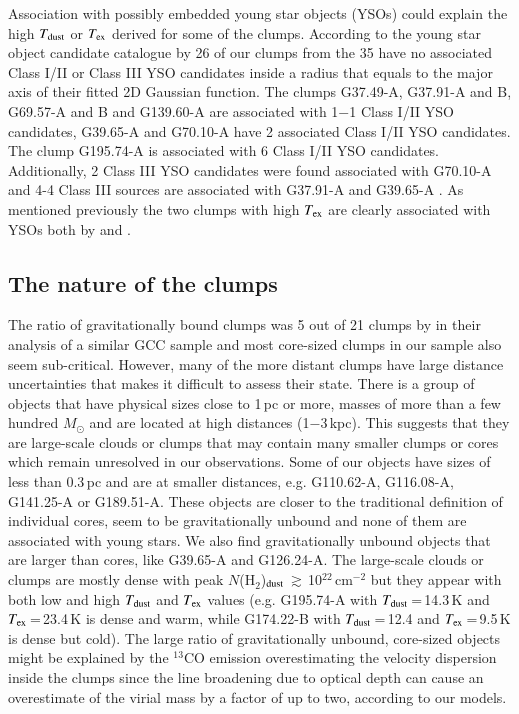 \documentclass[printer]{aa}
\begin{document}
Association with possibly embedded young star objects (YSOs) could explain the high $T_{\rm dust}$ or $T_{\rm ex}$ derived for some of the clumps. According to the young star object candidate catalogue by \citet{marton2016} 26 of our clumps from the 35 have no associated Class I/II or Class III YSO candidates inside a radius that equals to the major axis of their fitted 2D Gaussian function. The clumps G37.49-A, G37.91-A and B, G69.57-A and B and G139.60-A are associated with 1$-$1 Class I/II YSO candidates, G39.65-A and G70.10-A have 2 associated Class I/II YSO candidates. The clump G195.74-A is associated with 6 Class I/II YSO candidates. Additionally, 2 Class III YSO candidates were found associated with G70.10-A and 4-4 Class III sources are associated with G37.91-A and G39.65-A \citep{marton2016c}. As mentioned previously the two clumps with high $T_{\rm ex}$ are clearly associated with YSOs both by \citet{marton2016} and \citet{montillaud2015}. 

\subsection{The nature of the clumps}

The ratio of gravitationally bound clumps was 5 out of 21 clumps by \citet{parikka2015} in their analysis of a similar GCC sample and most core-sized clumps in our sample also seem sub-critical. However, many of the more distant clumps have large distance uncertainties that makes it difficult to assess their state. There is a group of objects that have physical sizes close to 1\,pc or more, masses of more than a few hundred $M_{\odot}$ and are located at high distances (1$-$3\,kpc).
This suggests that they are large-scale clouds or clumps that may contain many smaller clumps or cores which remain unresolved in our observations. Some of our objects have sizes of less than 0.3\,pc and are at smaller distances, e.g. G110.62-A, G116.08-A, G141.25-A or G189.51-A. These objects are closer to the traditional definition of individual cores, seem to be gravitationally unbound and none of them are associated with young stars. We also find gravitationally unbound objects that are larger than cores, like G39.65-A and G126.24-A. The large-scale clouds or clumps are mostly dense with peak $N$(H$_2$)$_{\rm dust}$\,$\gtrsim$\,10$^{22}$\,cm$^{-2}$ but they appear with both low and high $T_{\rm dust}$ and $T_{\rm ex}$ values (e.g. G195.74-A with $T_{\rm dust}$\,=\,14.3\,K and $T_{\rm ex}$\,=\,23.4\,K is dense and warm, while G174.22-B with $T_{\rm dust}$\,=\,12.4 and $T_{\rm ex}$\,=\,9.5\,K is dense but cold). The large ratio of gravitationally unbound, core-sized objects might be explained by the $^{13}$CO emission overestimating the velocity dispersion inside the clumps since the line broadening due to optical depth can cause an overestimate of the virial mass by a factor of up to two, according to our models.
\end{document}
